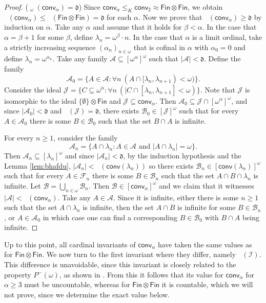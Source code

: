 \documentclass{amsart}
\theoremstyle{plain}
\theoremstyle{definition}
\theoremstyle{remark}
\newcommand{\cA}{\mathcal{A}}
\newcommand{\cB}{\mathcal{B}}
\newcommand{\cI}{\mathcal{I}}
\newcommand{\I}{\cI}
\newcommand{\cJ}{\mathcal{J}}
\newcommand{\J}{\cJ}
\newcommand{\dnumber}{\mathfrak{d}}
\DeclareMathOperator{\non}{non}
\DeclareMathOperator{\cov}{cov}
\DeclareMathOperator{\nons}{\non^*}
\DeclareMathOperator{\nono}{\non^*_{\omega}}
\DeclareMathOperator{\covp}{\cov^*_+}
\newcommand{\FIN}{\mathsf{Fin}}
\newcommand{\fin}{\FIN}
\newcommand{\Fin}{\FIN}
\newcommand{\conv}{\mathsf{conv}}
\renewcommand{\subset}{\subseteq}
\begin{document}
\begin{proof}
     ($\nons_\omega(\conv_\alpha) = \dnumber$) 
     Since $\conv_\alpha \leq_{K}  \conv_2 \approx \Fin\otimes\fin$, we obtain $\nono (\conv_\alpha)\leq \nono(\Fin\otimes\fin)=\dnumber$ for each $\alpha$.
    Now we prove that  $\nono (\conv_\alpha)\geq \dnumber$ by induction on $\alpha$. Take any $\alpha$ and assume that it holds for $\beta < \alpha$.     
    In the case that $\alpha=\beta+1$ for some $\beta$, define $\lambda_n=\omega^\beta\cdot n$. In the case that $\alpha$ is a limit ordinal, take a strictly increasing sequence $(\alpha_n)_{n\in\omega}$ that is cofinal in $\alpha$ with $\alpha_0=0$ and define $\lambda_n=\omega^{\alpha_n}$.
     Take any family $\cA\subset [\omega^\alpha]^\omega$ such that $|\cA|<\dnumber$. Define the family $$\cA_0=\{A\in\cA : \forall n \ (A\cap[\lambda_n, \lambda_{n+1})<\omega)\}.$$
     Consider the ideal $\J=\{C\subset \omega^\alpha : \forall n \ (|C\cap [\lambda_n, \lambda_{n+1}]< \omega )\}.$ Note that $\J$ is isomorphic to the ideal $\{\emptyset\}\otimes\fin$ and $\cJ\subset \conv_\alpha$. Then $\cA_0\subset \J\cap[\omega^\alpha]^\omega$, and since $|\cA_0|<\dnumber$ and $\nono(\J)=\dnumber$,  there exists $\cB_0\in [\J]^\omega$ such that for every $A\in\mathcal{A}_0$ there is some $B\in\cB_0$ such that the set $B\cap A$ is infinite.

      For every $n\geq1$, consider the family $$\cA_n= \{A\cap\lambda_n : A\in\mathcal{A}\text{ and } |A\cap\lambda_n|=\omega\}.$$ Then $\mathcal{A}_n\subset[\lambda_n]^\omega$ and since $|\mathcal{A}_n|<\dnumber$, by the induction hypothesis and the Lemma \ref{lem:bhafdu}, $|\cA_n|<\nono(\conv(\lambda_n))$ so there exists $\mathcal{B}_n\in[\conv(\lambda_n)]^\omega$ such that for every $A\in\mathcal{F}_n$ there is some $B\in\mathcal{B}_n$ such that the set $A\cap B\cap\lambda_n$ is infinite. 
      Let $\mathcal{B}=\bigcup_{n\in\omega}\mathcal{B}_n $. Then $\cB\in [\conv_\alpha]^\omega$ and we claim that it witnesses $|\mathcal{A}|<\nono(\conv_{\alpha})$. Take any $A\in\mathcal{A}$. Since it is infinite, either there is some $n\geq 1$ such that the set $A\cap\lambda_n$ is infinite, then the set $A\cap B$ is infinite for some $B\in\mathcal{B}_n$, or $A\in\cA_0$ in which case one can find a corresponding $B\in\cB_0$ with $
      B\cap A$ being infinite.
\end{proof}


Up to this point, all cardinal invariants of $\conv_\alpha$ have taken the same values as for $\fin\otimes\fin$. We now turn to the first invariant where they differ, namely $\covp(\I)$. This difference is unavoidable, since this invariant is closely related to the property $P^-(\omega)$, as shown in \cite[Theorem~6.5 and Proposition~2.5]{MR4584767}. From this it follows that its value for $\conv_\alpha$ for $\alpha\geq3$ must be uncountable, whereas for $\fin\otimes\fin$ it is countable, which we will not prove, since we determine the exact value below.
\end{document}
